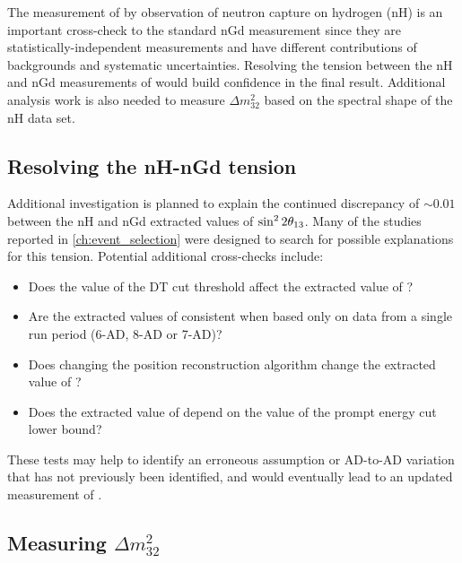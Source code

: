 The measurement of \thetaot{} by observation of neutron capture on hydrogen (nH)
is an important cross-check to the standard nGd measurement
since they are statistically-independent measurements and
have different contributions of backgrounds and systematic uncertainties.
Resolving the tension between the nH and nGd measurements of \thetaot{}
would build confidence in the final result.
Additional analysis work is also needed to measure $\Delta m^2_{32}$
based on the spectral shape of the nH data set.

\subsection{Resolving the nH-nGd tension}
\label{subsec:tension}

Additional investigation is planned to explain the continued discrepancy
of ${\sim}0.01$ between the nH and nGd extracted values of $\sin^22\theta_{13}$.
Many of the studies reported in \cref{ch:event_selection}
were designed to search for possible explanations for this tension.
Potential additional cross-checks include:
\begin{itemize}
    \item Does the value of the DT cut threshold affect the extracted value of
        \thetaot{}?
    \item Are the extracted values of \thetaot{} consistent when
        based only on data from a single run period (6-AD, 8-AD or 7-AD)?
    \item Does changing the position reconstruction algorithm
        change the extracted value of \thetaot{}?
    \item Does the extracted value of \thetaot{} depend on
        the value of the prompt energy cut lower bound?
\end{itemize}
These tests may help to identify an erroneous assumption
or AD-to-AD variation that has not previously been identified,
and would eventually lead to an updated measurement of \thetaot{}.


\subsection{Measuring \texorpdfstring{$\Delta m^2_{32}$}{the 3,2 mass splitting}}
\label{subsec:rateplusshape}

